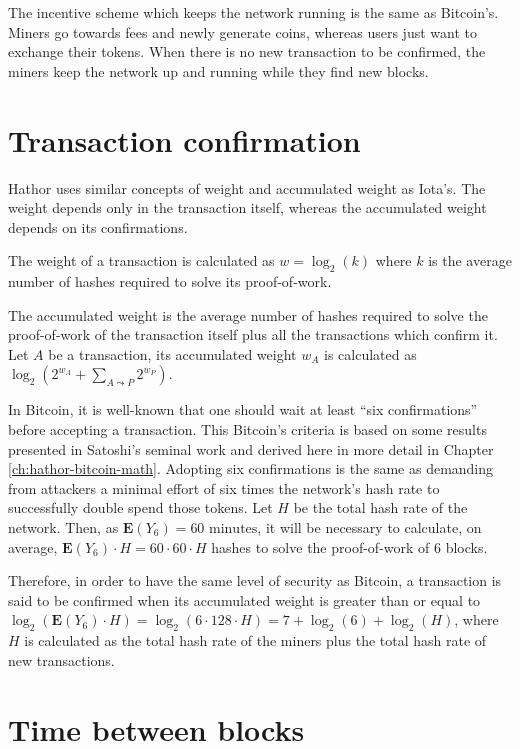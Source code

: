 The incentive scheme which keeps the network running is the same as Bitcoin's. Miners go towards fees and newly generate coins, whereas users just want to exchange their tokens. When there is no new transaction to be confirmed, the miners keep the network up and running while they find new blocks.


\section{Transaction confirmation}

Hathor uses similar concepts of weight and accumulated weight as Iota's. The weight depends only in the transaction itself, whereas the accumulated weight depends on its confirmations.

The weight of a transaction is calculated as $w = \log_2(k)$ where $k$ is the average number of hashes required to solve its proof-of-work.

The accumulated weight is the average number of hashes required to solve the proof-of-work of the transaction itself plus all the transactions which confirm it. Let $A$ be a transaction, its accumulated weight $w_A$ is calculated as $\log_2(2^{w_A} + \sum_{A \leadsto P} 2^{w_P})$.

In Bitcoin, it is well-known that one should wait at least ``six confirmations'' before accepting a transaction. This Bitcoin's criteria is based on some results presented in Satoshi's seminal work \citep{nakamoto2008bitcoin} and derived here in more detail in Chapter \ref{ch:hathor-bitcoin-math}. Adopting six confirmations is the same as demanding from attackers a minimal effort of six times the network's hash rate to successfully double spend those tokens. Let $H$ be the total hash rate of the network. Then, as $\mathbf{E}(Y_6) = 60 \text{ minutes}$, it will be necessary to calculate, on average, $\mathbf{E}(Y_6) \cdot H = 60 \cdot 60 \cdot H$ hashes to solve the proof-of-work of 6 blocks.

Therefore, in order to have the same level of security as Bitcoin, a transaction is said to be confirmed when its accumulated weight is greater than or equal to $\log_2(\mathbf{E}(Y_6) \cdot H) = \log_2(6 \cdot 128 \cdot H) = 7 + \log_2(6) + \log_2(H)$, where $H$ is calculated as the total hash rate of the miners plus the total hash rate of new transactions.


\section{Time between blocks}

